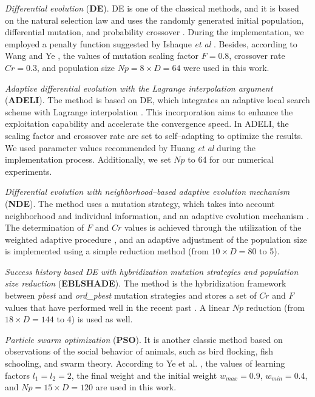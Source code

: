 \documentclass[a4paper,fleqn]{cas-sc}
\begin{document}
\emph{Differential evolution} (\textbf{DE}).
DE is one of the classical methods,
and  it is based on the natural selection law and uses the randomly generated initial population,
differential mutation, and probability crossover \cite{DEWang}.
During the implementation, we employed a penalty function suggested by Ishaque \emph{et al} \cite{P-DE_Ishaque}.
Besides, according to Wang and Ye \cite{DEWang}, the values of mutation scaling factor $F=0.8$,
crossover rate $C\!r=0.3$, and population size $N\!p=8\times D=64$ were used in this work.

\emph{Adaptive differential evolution with the Lagrange interpolation argument} (\textbf{ADELI}).
The method is based on DE, which integrates an adaptive local search scheme with Lagrange interpolation \cite{ADELI}.
This incorporation aims to enhance the exploitation capability and accelerate the convergence speed.
In ADELI, the scaling factor and crossover rate are set to self--adapting to optimize the results.
We used parameter values recommended by Huang \emph{et al} \cite{ADELI} during the implementation process.
Additionally, we set $N\!p$ to 64 for our numerical experiments.

\emph{Differential evolution with neighborhood--based adaptive evolution mechanism} (\textbf{NDE}).
The method uses a mutation strategy, which takes into account neighborhood and individual information, and an adaptive evolution mechanism \cite{NDE}.
The determination of $F$ and $C\!r$ values is achieved through the utilization of the weighted adaptive procedure \cite{Tanabe2014},
and an adaptive adjustment of the population size is implemented using a simple reduction method (from $10\times D=80$ to 5).

\emph{Success history based DE with hybridization mutation strategies and population size reduction} (\textbf{EBLSHADE}).
The method is the hybridization framework between \emph{pbest} and \emph{ord\_pbest} mutation strategies
and stores a set of $Cr$ and $F$ values that have performed well in the recent past \cite{EBLSHADE}.
A linear $N\!p$ reduction (from $18\times D=144$ to 4) is used as well.

\emph{Particle swarm optimization} (\textbf{PSO}).
It is another classic method based on observations of the social behavior of animals,
such as bird flocking, fish schooling, and swarm theory.
According to Ye et al. \cite{PSO},  the values of learning factors $l_1=l_2=2$,
the final weight and the initial weight $w_{max}=0.9$, $w_{min}=0.4$, and
$N\!p=15\times D=120$ are used in this work.
\end{document}
